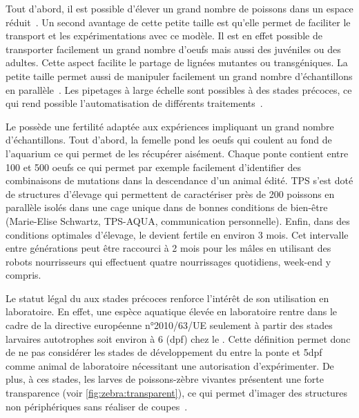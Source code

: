 \documentclass[\main/main.tex]{subfiles}
\begin{document}
%
Tout d'abord, il est possible d'élever un grand nombre de poissons dans un espace réduit~\cite{avdesh_2012}.
%
Un second avantage de cette petite taille est qu'elle permet de faciliter le transport et les expérimentations avec ce modèle.
%
Il est en effet possible de transporter facilement un grand nombre d'oeufs mais aussi des juvéniles ou des adultes.
%
Cette aspect facilite le partage de lignées mutantes ou transgéniques.
%
%
La petite taille permet aussi de manipuler facilement un grand nombre d'échantillons en parallèle~\cite{wittbrodt_2014,brion_2012}. Les pipetages à large échelle sont possibles à des stades précoces,
ce qui rend possible l'automatisation de différents traitements~\cite{mandrell_2012,teixid_2019}.

Le \pz{} possède une fertilité adaptée aux expériences impliquant un grand nombre d'échantillons.
%
Tout d'abord, la femelle pond les oeufs qui coulent au fond de l'aquarium ce  qui permet de les récupérer aisément. Chaque ponte contient entre 100 et 500 oeufs ce qui permet par exemple facilement d'identifier des combinaisons de mutations dans la descendance d'un animal édité. TPS s'est doté de structures d'élevage qui permettent de caractériser près de 200 poissons en parallèle isolés dans une cage unique dans de bonnes conditions de bien-être (Marie-Elise Schwartz, TPS-AQUA, communication personnelle).  
%
Enfin, dans des conditions optimales d'élevage, le \pz{} devient fertile en environ 3 mois. Cet intervalle entre générations peut être raccourci à 2 mois pour les mâles en utilisant des robots nourrisseurs qui effectuent quatre nourrissages quotidiens, week-end y compris. 


Le statut légal du \pz{} aux stades précoces renforce l'intérêt de son utilisation en laboratoire.
%
En effet, une espèce aquatique élevée en laboratoire rentre dans le cadre de la directive européenne n°2010/63/UE seulement à partir des stades larvaires autotrophes soit environ à 6 \dpf{} (dpf) chez le \pz{}.
%
Cette définition permet donc de ne pas considérer les stades de développement du \pz{} entre la ponte et 5dpf comme animal de laboratoire nécessitant une autorisation d'expérimenter.
%
%
De plus, à ces stades, les larves de poissons-zèbre vivantes présentent une forte transparence (voir \autoref{fig:zebra:transparent}),
ce qui permet d'imager des structures non périphériques sans réaliser de coupes~\cite{asokan_2020,chen_2020,hamilton_2016,kioka_2020}.
\end{document}

